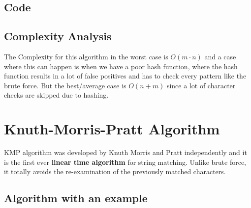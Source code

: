 \documentclass[a4paper, 12pt]{report}
\begin{document}
    \subsection{Code}
    
    

    \subsection{Complexity Analysis}

   The Complexity for this algorithm in the worst case is $O(m\cdot n)$ and a case where this can happen is when we have a poor hash function, where the hash function results in a lot of false positives and has to check every pattern like the brute force. But the best/average case is $O(n+m)$ since a lot of character checks are skipped due to hashing.

    \newpage
    \section{Knuth-Morris-Pratt Algorithm }
    KMP algorithm \cite{Knuthf1977} was developed by Knuth Morris and Pratt independently and it is the first ever \textbf{linear time algorithm} for string matching. Unlike brute force, it totally avoids the re-examination of the previously matched characters.

    
    \subsection{Algorithm with an example}
\end{document}
